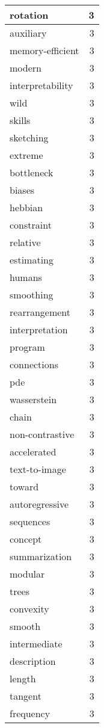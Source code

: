 \begin{table}[h]
\begin{tabular}{|l|r|}
\hline
rotation & 3 \\
\hline
auxiliary & 3 \\
\hline
memory-efficient & 3 \\
\hline
modern & 3 \\
\hline
interpretability & 3 \\
\hline
wild & 3 \\
\hline
skills & 3 \\
\hline
sketching & 3 \\
\hline
extreme & 3 \\
\hline
bottleneck & 3 \\
\hline
biases & 3 \\
\hline
hebbian & 3 \\
\hline
constraint & 3 \\
\hline
relative & 3 \\
\hline
estimating & 3 \\
\hline
humans & 3 \\
\hline
smoothing & 3 \\
\hline
rearrangement & 3 \\
\hline
interpretation & 3 \\
\hline
program & 3 \\
\hline
connections & 3 \\
\hline
pde & 3 \\
\hline
wasserstein & 3 \\
\hline
chain & 3 \\
\hline
non-contrastive & 3 \\
\hline
accelerated & 3 \\
\hline
text-to-image & 3 \\
\hline
toward & 3 \\
\hline
autoregressive & 3 \\
\hline
sequences & 3 \\
\hline
concept & 3 \\
\hline
summarization & 3 \\
\hline
modular & 3 \\
\hline
trees & 3 \\
\hline
convexity & 3 \\
\hline
smooth & 3 \\
\hline
intermediate & 3 \\
\hline
description & 3 \\
\hline
length & 3 \\
\hline
tangent & 3 \\
\hline
frequency & 3 \\

\end{tabular}
\end{table}
